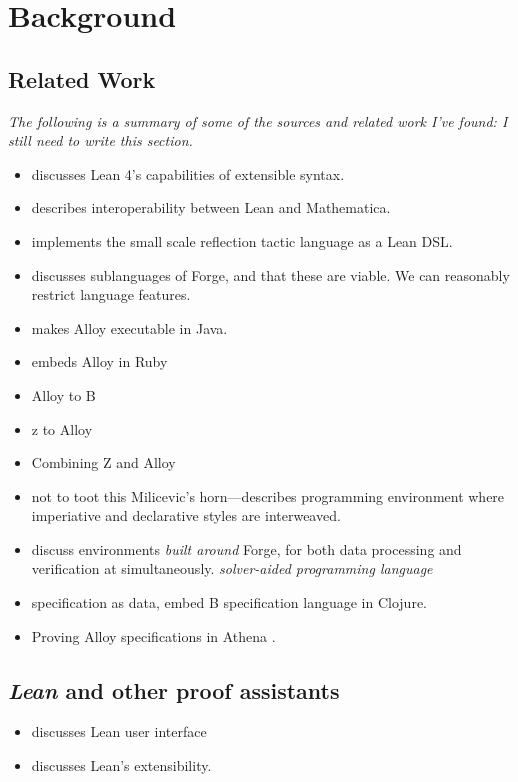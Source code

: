 \section{Background}
\subsection{Related Work}
\emph{The following is a summary of some of the sources and related work I've found: I still need to write this section.}
\begin{itemize}
    \item \cite{ullrich2022beyond} discusses Lean 4's capabilities of extensible syntax. 
    \item \cite{lewis2022bi} describes interoperability between Lean and Mathematica. 
    \item \cite{gladshtein2024small} implements the small scale reflection tactic language as a Lean DSL. 
    \item \cite{ngpdbccdlrrvwwk-oopsla-2024} discusses sublanguages of Forge, and that these are viable. We can reasonably restrict language features. 
    \item \cite{milicevic2010executable} makes Alloy executable in Java. 
    \item \cite{milicevic2014alpha} embeds Alloy in Ruby
    \item \cite{krings2018translation} Alloy to B 
    \item \cite{malik2010translating} z to Alloy
    \item \cite{mikhailov2002approach} Combining Z and Alloy
    \item \cite{milicevic2015advancing} not to toot this Milicevic's horn---describes programming environment where imperiative and declarative styles are interweaved. 
    \item \cite{st2023comparison} discuss environments \emph{built around} Forge, for both data processing and verification at simultaneously. \emph{solver-aided programming language}
    \item \cite{korner2022embedding} specification as data, embed B specification language in Clojure. 
    \item \cite{arkoudas2004integrating} Proving Alloy specifications in Athena \cite{arkoudas2000denotational,musser2003proving}.
\end{itemize}

\subsection{\emph{Lean} and other proof assistants}
\begin{itemize}
    \item \cite{nawrocki2023extensible} discusses Lean user interface
    \item \cite{moura2021lean} discusses Lean's extensibility. 
\end{itemize}

